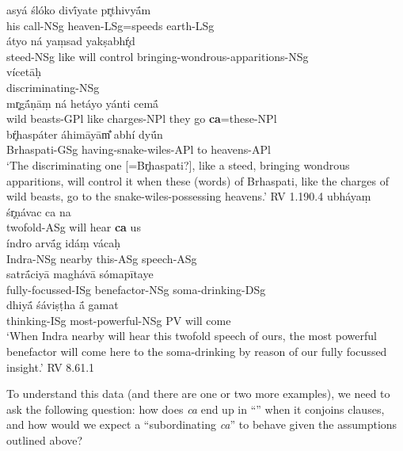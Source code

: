 \documentclass[output=paper,
modfonts
]{LSP/langsci}
\begin{document}
\begin{exe}
\ex\label{lateca}
	\begin{xlist}
	\ex\gll asyá ślóko divī́yate pr̥thivyā́m \\
			his call-NSg heaven-LSg=speeds earth-LSg \\
			
		\gll átyo ná yaṃsad yakṣabhŕ̥d \\
			steed-NSg like {will control} bringing-wondrous-apparitions-NSg \\
			
		\gll \hspace*{1em} vícetāḥ \\
			{} discriminating-NSg \\
			
		\gll mr̥gā́ṇāṃ ná hetáyo yánti cemā́ \\
			{wild beasts-GPl} like charges-NPl {they go} \textbf{ca}=these-NPl \\
		\gll bŕ̥haspáter áhimāyām̐ abhí dyū́n \\
			Brhaspati-GSg having-snake-wiles-APl to heavens-APl \\
		\glt `The discriminating one [=Br̥haspati?], like a steed, bringing wondrous apparitions, will control it when these (words) of Brhaspati, like the charges of wild beasts, go to the snake-wiles-possessing heavens.'		\hfill {RV 1.190.4}
	\ex\gll ubháyaṃ śr̥ṇávac ca na \\
		twofold-ASg {will hear} \textbf{ca} us \\
		
		\gll índro arvā́g idáṃ vácaḥ \\
		Indra-NSg nearby this-ASg speech-ASg \\
		
		\gll satrā́ciyā maghávā sómapītaye \\
			fully-focussed-ISg benefactor-NSg soma-drinking-DSg \\
			
		\gll dhiyā́ śáviṣṭha ā́ gamat \\
			thinking-ISg most-powerful-NSg PV {will come} \\
		\glt `When Indra nearby will hear this twofold speech of ours, the most powerful benefactor will come here to the soma-drinking by reason of our fully focussed insight.' \hfill {RV 8.61.1} \\
	\end{xlist}
\end{exe}

\noindent To understand this data (and there are one or two more examples), we need to ask the following question: how does
 \textit{ca} end up in ``'' when it conjoins clauses, and how would we expect a ``subordinating
\textit{ca}'' to behave given the assumptions outlined above?
\end{document}
